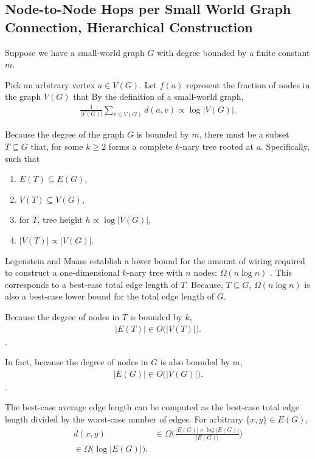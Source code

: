 \subsection{Node-to-Node Hops per Small World Graph Connection, Hierarchical Construction}

Suppose we have a small-world graph $G$ with degree bounded by a finite constant $m$.

Pick an arbitrary vertex $a \in V(G)$.
Let $f(a)$ represent the fraction of nodes in the graph $V(G)$ that
By the definition of a small-world graph,
\begin{align*}
  \frac{1}{|V(G)|} \sum_{v \in V(G)} d(a, v) \propto \log |V(G)|.
\end{align*}

Because the degree of the graph $G$ is bounded by $m$, there must be a subset $T \subseteq G$ that, for some $k \geq 2$ forms a complete $k$-nary tree rooted at $a$.
Specifically, such that
\begin{enumerate}
  \item $E(T) \subseteq E(G)$,
  \item $V(T) \subseteq V(G)$,
  \item for $T$, tree height $h \propto \log |V(G)|$,
  \item $|V(T)| \propto |V(G)|$.
\end{enumerate}

Legenstein and Maass establish a lower bound for the amount of wiring required to construct a one-dimensional $k$-nary tree with $n$ nodes: $\Omega(n \log n)$ \citep{legenstein2001optimizing}.
This corresponds to a best-case total edge length of $T$.
Because, $T \subseteq G$, $\Omega(n \log n)$ is also a best-case lower bound for the total edge length of $G$.

Because the degree of nodes in $T$ is bounded by $k$,
\begin{align*}
|E(T)| \in O \Big( |V(T)| \Big).
\end{align*}.

In fact, because the degree of nodes in $G$ is also bounded by $m$,
\begin{align*}
|E(G)| \in O \Big( |V(G)| \Big).
\end{align*}.

The best-case average edge length can be computed as the best-case total edge length divided by the worst-case number of edges.
For arbitrary $\{x, y\} \in E(G)$,
\begin{align*}
\bar{d}(x, y) &
\in \Omega \Big( \frac{ |E(G)| \times \log |E(G)| }{ |E(G)| } \Big)\\
\in \Omega \Big( \log |E(G)| \Big).
\end{align*}

